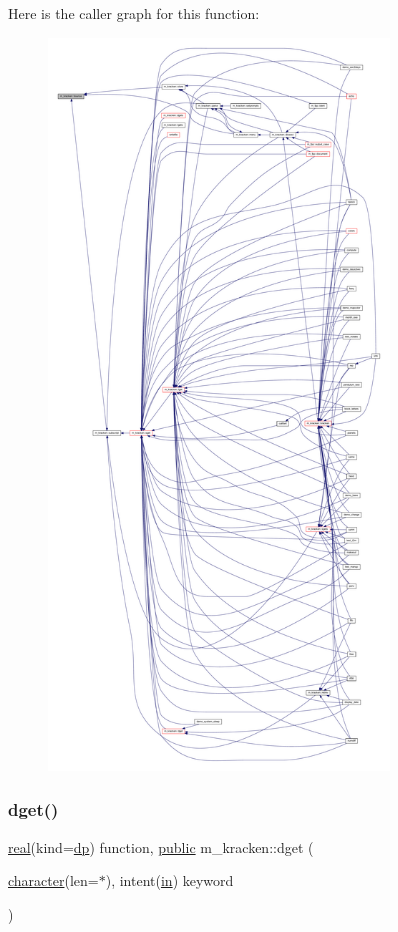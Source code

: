 Here is the caller graph for this function\+:
\nopagebreak
\begin{figure}[H]
\begin{center}
\leavevmode
\includegraphics[height=550pt]{namespacem__kracken_af9225957a50e8e0559605911c4c5ee02_icgraph}
\end{center}
\end{figure}
\mbox{\label{namespacem__kracken_ae7b6ad046d637f03148efb56336a7ff4}} 
\subsubsection{\texorpdfstring{dget()}{dget()}}
{\footnotesize\ttfamily \hyperlink{read__watch_83_8txt_abdb62bde002f38ef75f810d3a905a823}{real}(kind=\hyperlink{namespacem__kracken_a1de91e5ca55bf4fab118936bf4fad36a}{dp}) function, \hyperlink{M__stopwatch_83_8txt_a2f74811300c361e53b430611a7d1769f}{public} m\+\_\+kracken\+::dget (\begin{DoxyParamCaption}\item[{\hyperlink{option__stopwatch_83_8txt_abd4b21fbbd175834027b5224bfe97e66}{character}(len=$\ast$), intent(\hyperlink{M__journal_83_8txt_afce72651d1eed785a2132bee863b2f38}{in})}]{keyword }\end{DoxyParamCaption})}



